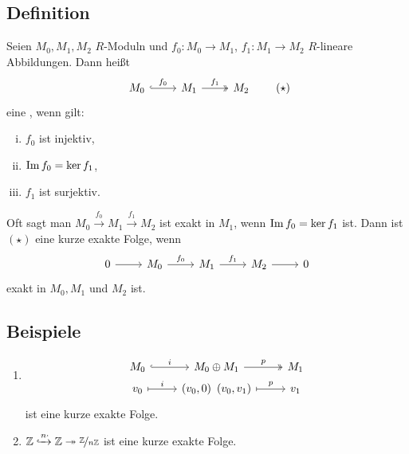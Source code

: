 \subsection[Definition: Kurze exakte Sequenz]{Definition} %
\label{sub:43}
Seien $M_0, M_1, M_2$ $R$-Moduln und $f_0 : M_0 \to M_1$, $f_1 : M_1 \to M_2$ $R$-lineare Abbildungen. Dann heißt 
\[
	\begin{tikzcd}
		M_0 \rar["f_0", hook] & M_1 \rar["f_1", two heads]& M_2 
	\end{tikzcd} \tag*{$(\star)$}
\]
eine , wenn gilt:
\begin{multicols}{3}
	\begin{enumerate}[(i)]
		\item $f_0$ ist injektiv,
		\item $\im f_0 = \ker f_1$,
		\item $f_1$ ist surjektiv.
	\end{enumerate}
\end{multicols}
Oft sagt man $M_0 \xrightarrow{f_0} M_1 \xrightarrow{f_1} M_2$ ist exakt in $M_1$, wenn $\im f_0 = \ker f_1$ ist. Dann ist $(\star)$ eine kurze exakte Folge, wenn
\[
	\begin{tikzcd}
		0 \rar & M_0 \rar["f_0"] & M_1 \rar["f_1"]& M_2 \rar & 0
	\end{tikzcd}
\]
exakt in $M_0, M_1$ und $M_2$ ist.

\subsection[Beispiele für kurze exakte Folgen]{Beispiele} %
\label{sub:44}
\begin{enumerate}[1)]
	\item \[
		\begin{tikzcd}[row sep=0.3em]
			M_0 \rar["i",hook] & M_0 \oplus M_1 \rar["p",two heads] & M_1 \\
			v_0 \rar["i", mapsto] & (v_0,0) \enspace (v_0,v_1) \rar["p",mapsto] & v_1
		\end{tikzcd}
	\]
	ist eine kurze exakte Folge.
	\item $\mathds{Z} \xhookrightarrow{n \cdot } \mathds{Z} \twoheadrightarrow \nicefrac{\mathds{Z}}{n \mathds{Z}}$
	ist eine kurze exakte Folge.
\end{enumerate}

